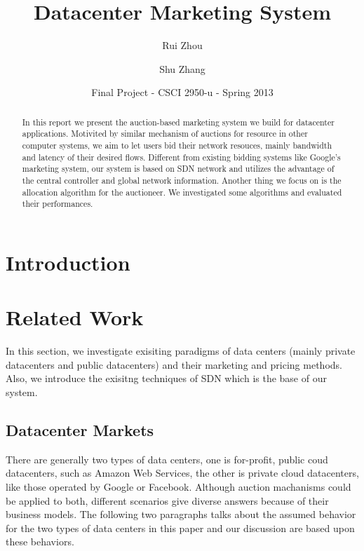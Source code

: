 \documentclass[11pt]{article}
\begin{document}
\title{Datacenter Marketing System}
\author{Rui Zhou \and Shu Zhang}
\date{Final Project - CSCI 2950-u - Spring 2013}
\maketitle

\begin{abstract}
In this report we present the auction-based marketing system we build for datacenter applications.
Motivited by similar mechanism of auctions for resource in other computer systems, we aim to 
let users bid their network resouces, mainly bandwidth and latency of their desired flows. Different from existing 
bidding systems like Google's marketing system\cite{google}, our system is based on SDN network and utilizes the advantage
of the central controller and global network information. 
Another thing we focus on is the allocation algorithm for the auctioneer. We investigated some 
algorithms and evaluated their performances. 
\end{abstract}

\section{Introduction}

\section{Related Work}
In this section, we investigate exisiting paradigms of data centers (mainly private datacenters and public datacenters) and their marketing and 
pricing methods. Also, we introduce the exisitng techniques of SDN which is the base of our system.
\subsection{Datacenter Markets}
There are generally two types of data centers, one is for-profit, public coud datacenters, such as Amazon Web Services\cite{aws}, the other is private cloud
datacenters, like those operated by Google or Facebook. Although auction machanisms could be applied to both, different scenarios give diverse answers because of 
their business models. The following two paragraphs talks about the assumed behavior for the two types of data centers in this paper and our discussion are 
based upon these behaviors.
\end{document}
